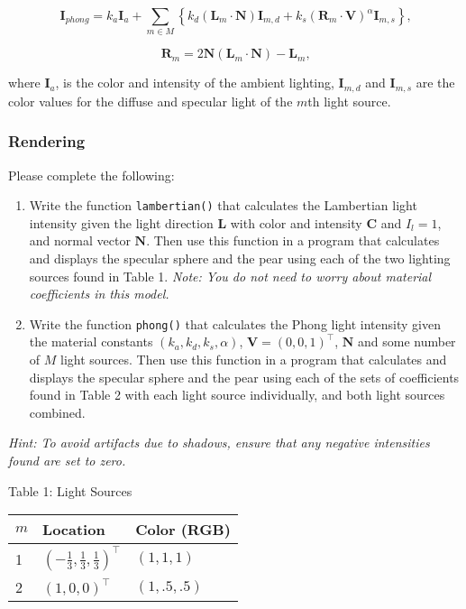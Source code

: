 \documentclass[11pt]{article}
\begin{document}
\[\mathbf{I}_{phong} = k_{a}\mathbf{I}_{a} + \sum_{m\in M}\left\{k_d(\mathbf{L}_{m}\cdot\mathbf{N})\mathbf{I}_{m,d} + k_{s}(\mathbf{R}_{m}\cdot\mathbf{V})^{\alpha}\mathbf{I}_{m,s}\right\}\text{,}\]

\[\mathbf{R}_{m} = 2\mathbf{N}(\mathbf{L}_{m}\cdot\mathbf{N}) - \mathbf{L}_{m}\text{,}\]

where \(\mathbf{I}_{a}\), is the color and intensity of the ambient
lighting, \(\mathbf{I}_{m,d}\) and \(\mathbf{I}_{m,s}\) are the color
values for the diffuse and specular light of the \(m\)th light source.

\hypertarget{rendering}{%
\subsubsection{Rendering}\label{rendering}}

Please complete the following:

\begin{enumerate}
\def\labelenumi{\arabic{enumi}.}
\item
  Write the function \texttt{lambertian()} that calculates the
  Lambertian light intensity given the light direction \(\mathbf{L}\)
  with color and intensity \(\mathbf{C}\) and \(I_l = 1\), and normal
  vector \(\mathbf{N}\). Then use this function in a program that
  calculates and displays the specular sphere and the pear using each of
  the two lighting sources found in Table 1. \emph{Note: You do not need
  to worry about material coefficients in this model.}
\item
  Write the function \texttt{phong()} that calculates the Phong light
  intensity given the material constants \((k_a, k_d, k_s, \alpha)\),
  \(\mathbf{V} = (0, 0, 1)^\top\), \(\mathbf{N}\) and some number of
  \(M\) light sources. Then use this function in a program that
  calculates and displays the specular sphere and the pear using each of
  the sets of coefficients found in Table 2 with each light source
  individually, and both light sources combined.
\end{enumerate}

\emph{Hint: To avoid artifacts due to shadows, ensure that any negative
intensities found are set to zero.}

    Table 1: Light Sources

\begin{longtable}[]{@{}lll@{}}
\toprule
\(m\) & Location & Color (RGB)\tabularnewline
\midrule
\endhead
1 & \((-\tfrac{1}{3},\tfrac{1}{3},\tfrac{1}{3})^{\top}\) &
\((1,1,1)\)\tabularnewline
2 & \((1,0,0)^{\top}\) & \((1,.5,.5)\)\tabularnewline
\bottomrule
\end{longtable}
\end{document}
